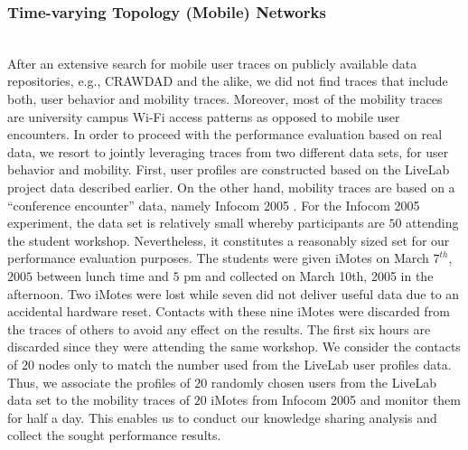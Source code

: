 \documentclass[12pt,epsf]{article}
\theoremstyle{definition}
\begin{document}
\subsubsection{Time-varying Topology (Mobile) Networks}
\vspace{-0.2 cm}
%
\\
%
After an extensive search for mobile user traces on publicly available data repositories, e.g., CRAWDAD \cite{infocom,diot} and the alike, we did not find traces that include both, user behavior and mobility traces. Moreover, most of the mobility traces are university campus Wi-Fi access patterns as opposed to mobile user encounters. In order to proceed with the performance evaluation based on real data, we resort to jointly leveraging traces from two
different data sets, for user behavior and mobility. First, user profiles are constructed based on the LiveLab project data \cite{data} described earlier. On the other hand, mobility traces are based on a ``conference encounter'' data, namely Infocom 2005 \cite{infocom,diot}. 
For the Infocom 2005 experiment, the data set is relatively small whereby participants are $50$ attending the student workshop. Nevertheless, it constitutes a reasonably sized set for our performance evaluation purposes. The students were given iMotes on March $7^{th}$, $2005$ between lunch time and $5$ pm and collected on March 10th, 2005 in the afternoon. Two iMotes were lost while seven did not deliver useful data due to an accidental hardware reset. Contacts with these nine iMotes were discarded from the traces of others to avoid any effect on the results. 
The first six hours are discarded since they were attending the same workshop. We consider the contacts of $20$ nodes only to match the number used from the LiveLab user profiles data. Thus, we associate the profiles of $20$ randomly chosen users from the LiveLab data set 
to the mobility traces of $20$ iMotes from Infocom 2005 and monitor them for half a day. This enables us to conduct our knowledge sharing analysis and collect the sought performance results.
\end{document}
